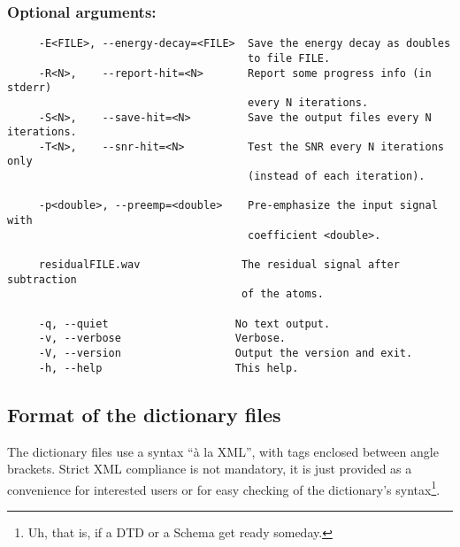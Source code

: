 \documentclass[11pt,a4paper]{article}
\begin{document}
\subsubsection*{Optional arguments:}
\begin{verbatim}
     -E<FILE>, --energy-decay=<FILE>  Save the energy decay as doubles
                                      to file FILE.
     -R<N>,    --report-hit=<N>       Report some progress info (in stderr)
                                      every N iterations.
     -S<N>,    --save-hit=<N>         Save the output files every N iterations.
     -T<N>,    --snr-hit=<N>          Test the SNR every N iterations only
                                      (instead of each iteration).

     -p<double>, --preemp=<double>    Pre-emphasize the input signal with
                                      coefficient <double>.

     residualFILE.wav                The residual signal after subtraction
                                     of the atoms.

     -q, --quiet                    No text output.
     -v, --verbose                  Verbose.
     -V, --version                  Output the version and exit.
     -h, --help                     This help.
\end{verbatim}



\clearpage
\subsection{Format of the dictionary files \label{dict_format}}
The dictionary files use a syntax ``\`a la XML'', with tags enclosed between
angle brackets. Strict XML compliance is not mandatory, it is just provided as
a convenience for interested users or for easy checking of the dictionary's
syntax\footnote{Uh, that is, if a DTD or a Schema get ready someday.}.
\end{document}
